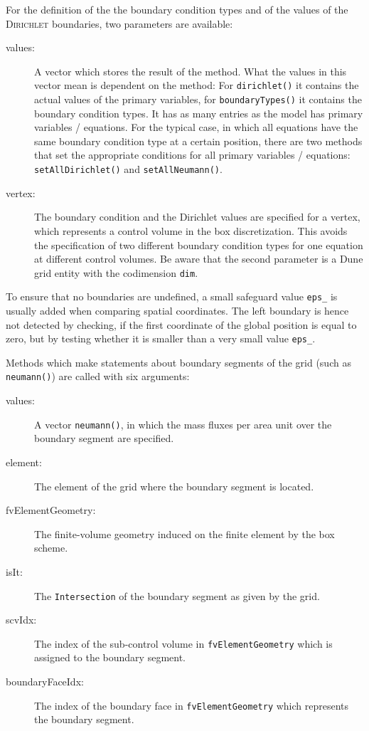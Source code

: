 For the definition of the the boundary condition types and of the
values of the \textsc{Dirichlet} boundaries, two parameters are
available:
\begin{description}
 \item [values:]  A vector which stores the result of the method. What
  the values in this vector mean is dependent on the method: For
  \texttt{dirichlet()} it contains the actual values of the primary
  variables, for \texttt{boundaryTypes()} it contains the boundary 
  condition types. It has as many entries as the model has primary variables / equations.
  For the typical case, in which all equations have the same boundary
  condition type at a certain position, there are two methods that set the appropriate conditions
  for all primary variables / equations: \texttt{setAllDirichlet()} and \texttt{setAllNeumann()}.
\item [vertex:] The boundary condition and the Dirichlet values are
  specified for a vertex, which represents a control volume in the box
  discretization. This avoids the specification of two different
  boundary condition types for one equation at different control
  volumes.  Be aware that the second parameter is a Dune grid entity
  with the codimension \texttt{dim}.
\end{description}

To ensure that no boundaries are undefined, a small safeguard value
\texttt{eps\_} is usually added when comparing spatial
coordinates. The left boundary is hence not detected by checking, if the
first coordinate of the global position is equal to zero, but by testing whether it is
smaller than a very small value \texttt{eps\_}.

Methods which make statements about boundary segments of the grid
(such as \texttt{neumann()}) are called with six arguments:
\begin{description}
\item[values:] A vector \texttt{neumann()}, in which the mass fluxes per area unit
  over the boundary segment are specified.
\item[element:] The element of the grid where the boundary segment
  is located.
\item[fvElementGeometry:] The finite-volume geometry induced on the
  finite element by the box scheme.
\item[isIt:] The \texttt{Intersection} of the boundary segment as given by the grid.
\item[scvIdx:] The index of the sub-control volume in
  \texttt{fvElementGeometry} which is assigned to the boundary segment.
\item[boundaryFaceIdx:] The index of the boundary face in
  \texttt{fvElementGeometry} which represents the boundary segment.  
\end{description}

